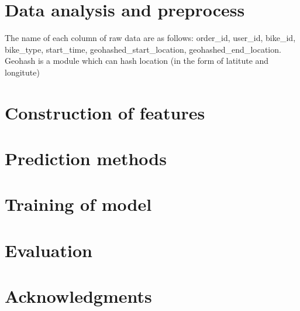 \documentclass[hyperref]{article}
\theoremstyle{nonumberplain}
\begin{document}
    \section{Data analysis and preprocess}
    The name of each column of raw data are as follows: order_id, user_id, bike_id, bike_type,
    start_time, geohashed_start_location, geohashed_end_location. Geohash is a module which can
    hash location (in the form of latitute and longitute)
    
    \section{Construction of features}

    \section{Prediction methods}

    \section{Training of model}

    \section{Evaluation}

    \section*{Acknowledgments}
    
\end{document}
